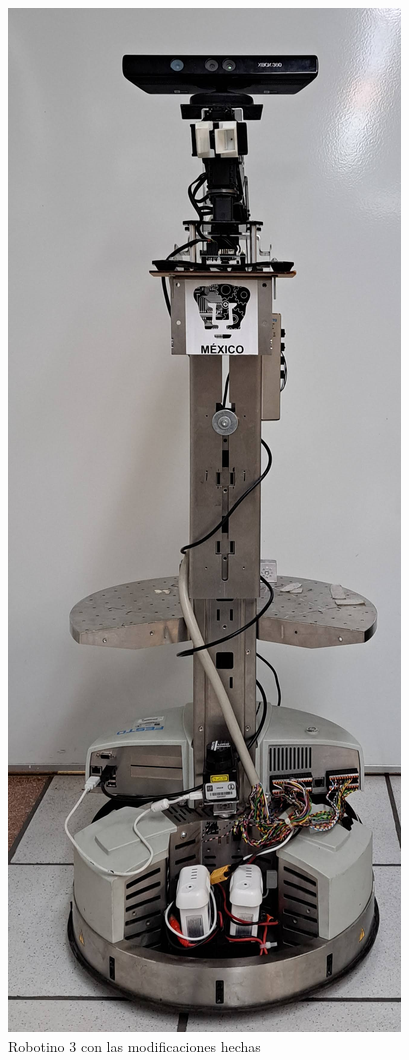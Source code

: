             \begin{figure}[H]
                \centering
                \includegraphics[scale=0.9]{Figures/Robotino_New_New.png}
                    \caption{Robotino 3 con las modificaciones hechas}
                    \label{fig:Robotino_NewNew}
            \end{figure}
                            

